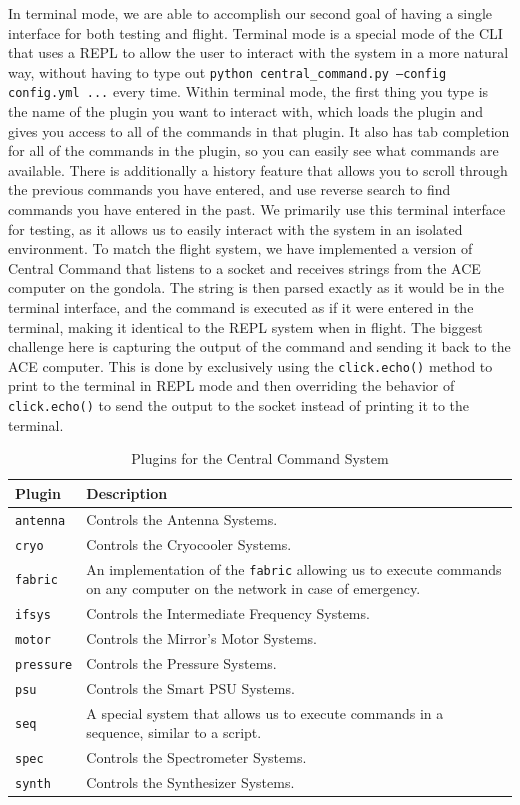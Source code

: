 In terminal mode, we are able to accomplish our second goal of having a single interface for both testing and flight.
Terminal mode is a special mode of the CLI that uses a REPL to allow the user to interact with the system in a more natural way, without having to type out \texttt{python central\_command.py --config config.yml ...} every time.
Within terminal mode, the first thing you type is the name of the plugin you want to interact with, which loads the plugin and gives you access to all of the commands in that plugin.
It also has tab completion for all of the commands in the plugin, so you can easily see what commands are available.
There is additionally a history feature that allows you to scroll through the previous commands you have entered, and use reverse search to find commands you have entered in the past.
We primarily use this terminal interface for testing, as it allows us to easily interact with the system in an isolated environment.
To match the flight system, we have implemented a version of Central Command that listens to a socket and receives strings from the ACE computer on the gondola. 
The string is then parsed exactly as it would be in the terminal interface, and the command is executed as if it were entered in the terminal, making it identical to the REPL system when in flight. 
The biggest challenge here is capturing the output of the command and sending it back to the ACE computer.
This is done by exclusively using the \texttt{click.echo()} method to print to the terminal in REPL mode and then overriding the behavior of \texttt{click.echo()} to send the output to the socket instead of printing it to the terminal.

\begin{table}
    \centering
    \begin{tabularx}{\textwidth}{l|X}
        \textbf{Plugin} & \textbf{Description} \\
        \hline
        \texttt{antenna} & Controls the Antenna Systems. \\
        \texttt{cryo} & Controls the Cryocooler Systems. \\
        \texttt{fabric} & An implementation of the \texttt{fabric} allowing us to execute commands on any computer on the network in case of emergency. \\
        \texttt{ifsys} & Controls the Intermediate Frequency Systems. \\
        \texttt{motor} & Controls the Mirror's Motor Systems. \\
        \texttt{pressure} & Controls the Pressure Systems. \\
        \texttt{psu} & Controls the Smart PSU Systems. \\
        \texttt{seq} & A special system that allows us to execute commands in a sequence, similar to a script. \\
        \texttt{spec} & Controls the Spectrometer Systems. \\
        \texttt{synth} & Controls the Synthesizer Systems. \\
    \end{tabularx}
    \caption{Plugins for the Central Command System}
    \label{readout/table:click_plugins}
\end{table}

